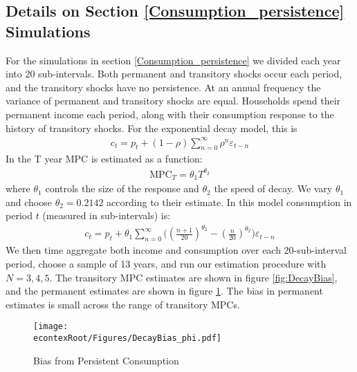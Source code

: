 \documentclass[titlepage]{\econtex}\newcommand{\texname}{ConsumptionHeterogeneity}
\begin{document}
	\subsection{Details on Section \ref{Consumption_persistence} Simulations}
	For the simulations in section \ref{Consumption_persistence} we divided each year into 20 sub-intervals. Both permanent and transitory shocks occur each period, and the transitory shocks have no persistence. At an annual frequency the variance of permanent and transitory shocks are equal. Households spend their permanent income each period, along with their consumption response to the history of transitory shocks. For the exponential decay model, this is
	\begin{align*}
	c_t = p_t + (1-\rho)\sum_{n=0}^{\infty}\rho^n \varepsilon_{t-n}
	\end{align*}
	In \cite{fagereng_mpc_2016} the T year MPC is estimated as a function:
	\begin{align*}
	\text{MPC}_T = \theta_1 T^{\theta_2}
	\end{align*}
	where $\theta_1$ controls the size of the response and $\theta_2$ the speed of decay. We vary $\theta_1$ and choose $\theta_2= 0.2142$ according to their estimate. In this model consumption in period $t$ (measured in sub-intervals) is:
	\begin{align*}
	c_t = p_t + \theta_1\sum_{n=0}^{\infty}\Big( (\frac{n+1}{20})^{\theta_2} -(\frac{n}{20})^{\theta_2} \Big)\varepsilon_{t-n}
	\end{align*}
	We then time aggregate both income and consumption over each 20-sub-interval period, choose a sample of 13 years, and run our estimation procedure with $N=3,4,5$. The transitory MPC estimates are shown in figure \ref{fig:DecayBias}, and the permanent estimates are shown in figure \ref{fig:DecayBias_phi}. The bias in permanent estimates is small across the range of transitory MPCs.
	\begin{figure} 
		\begin{centering}
			\texttt{[image: \\econtexRoot/Figures/DecayBias\_phi.pdf]}
			\caption{Bias from Persistent Consumption}
			\label{fig:DecayBias_phi}
		\end{centering}
	\end{figure}
\end{document}

